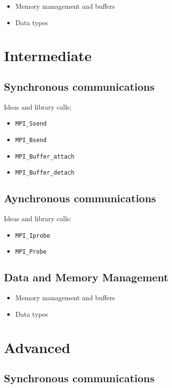 \begin{itemize}
\item Memory management and buffers
\item Data types
\end{itemize}

\section{Intermediate}

\subsection{Synchronous communications}

Ideas and library calls: \\
\begin{itemize}
\item \texttt{MPI\_Ssend}
\item \texttt{MPI\_Bsend}
\item \texttt{MPI\_Buffer\_attach}
\item \texttt{MPI\_Buffer\_detach}
\end{itemize}

\subsection{Aynchronous communications}

Ideas and library calls: \\
\begin{itemize}
\item \texttt{MPI\_Iprobe}
\item \texttt{MPI\_Probe}
\end{itemize}

\subsection{Data and Memory Management}

\begin{itemize}
\item Memory management and buffers
\item Data types
\end{itemize}


\section{Advanced}


\subsection{Synchronous communications}

